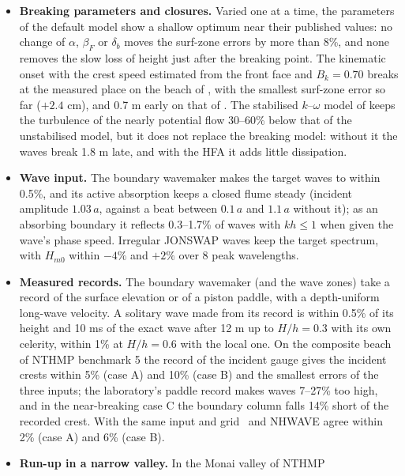 \begin{itemize}[nosep]
        diffusion.
  \item \textbf{Breaking parameters and closures.} Varied one at a time,
        the parameters of the default model show a shallow optimum near
        their published values: no change of $\alpha$, $\beta_F$ or
        $\delta_b$ moves the surf-zone errors by more than 8\%, and none
        removes the slow loss of height just after the breaking point.
        The kinematic onset with the crest speed estimated from the front
        face and $B_k = 0.70$ breaks at the measured place on the beach of
        \citet{ting1994}, with the smallest surf-zone error so far ($+2.4$
        cm), and 0.7 m early on that of \citet{hansen1979}. The stabilised
        $k$--$\omega$ model of \citet{larsen2018} keeps the turbulence of
        the nearly potential flow 30--60\% below that of the unstabilised
        model, but it does not replace the breaking model: without it the
        waves break 1.8 m late, and with the HFA it adds little
        dissipation.
  \item \textbf{Wave input.} The boundary wavemaker makes the target
        waves to within 0.5\%, and its active absorption keeps a closed
        flume steady (incident amplitude $1.03\,a$, against a beat between
        $0.1\,a$ and $1.1\,a$ without it); as an absorbing boundary it
        reflects 0.3--1.7\% of waves with $kh \le 1$ when given the wave's
        phase speed. Irregular JONSWAP waves keep the target spectrum,
        with $H_{m0}$ within $-4\%$ and $+2\%$ over 8 peak wavelengths.
  \item \textbf{Measured records.} The boundary wavemaker (and the
        wave zones) take a record of the surface elevation or of a piston
        paddle, with a depth-uniform long-wave velocity. A solitary wave
        made from its record is within 0.5\% of its height and 10 ms of
        the exact wave after 12 m up to $H/h = 0.3$ with its own celerity,
        within 1\% at $H/h = 0.6$ with the local one. On the composite
        beach of NTHMP benchmark 5 the record of the incident gauge gives
        the incident crests within 5\% (case A) and 10\% (case B) and the
        smallest errors of the three inputs; the laboratory's paddle record
        makes waves 7--27\% too high, and in the near-breaking case C the
        boundary column falls 14\% short of the recorded crest. With the
        same input and grid \NHFOAM\ and NHWAVE agree within 2\% (case A)
        and 6\% (case B).
  \item \textbf{Run-up in a narrow valley.} In the Monai valley of NTHMP

\end{itemize}
